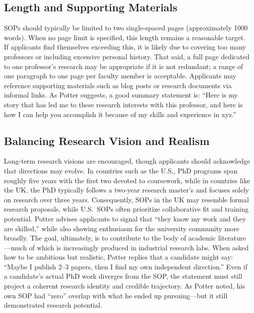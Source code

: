 \subsection{Length and Supporting Materials}

SOPs should typically be limited to two single-spaced pages (approximately 1000 words).
When no page limit is specified, this length remains a reasonable target.
If applicants find themselves exceeding this, it is likely due to covering too many professors or including excessive personal history.
That said, a full page dedicated to one professor's research may be appropriate if it is not redundant; a range of one paragraph to one page per faculty member is acceptable.
Applicants may reference supporting materials such as blog posts or research documents via informal links.
As Potter suggests, a good summary statement is: ``Here is my story that has led me to these research interests with this professor, and here is how I can help you accomplish it because of my skills and experience in xyz.''

\subsection{Balancing Research Vision and Realism}

Long-term research visions are encouraged, though applicants should acknowledge that directions may evolve.
In countries such as the U.S., PhD programs span roughly five years with the first two devoted to coursework, while in countries like the UK, the PhD typically follows a two-year research master's and focuses solely on research over three years.
Consequently, SOPs in the UK may resemble formal research proposals, while U.S.\ SOPs often prioritize collaborative fit and training potential.
Potter advises applicants to signal that ``they know my work and they are skilled,'' while also showing enthusiasm for the university community more broadly.
The goal, ultimately, is to contribute to the body of academic literature---much of which is increasingly produced in industrial research labs.
When asked how to be ambitious but realistic, Potter replies that a candidate might say: ``Maybe I publish 2--3 papers, then I find my own independent direction.''
Even if a candidate's actual PhD work diverges from the SOP, the statement must still project a coherent research identity and credible trajectory.
As Potter noted, his own SOP had ``zero'' overlap with what he ended up pursuing---but it still demonstrated research potential.

